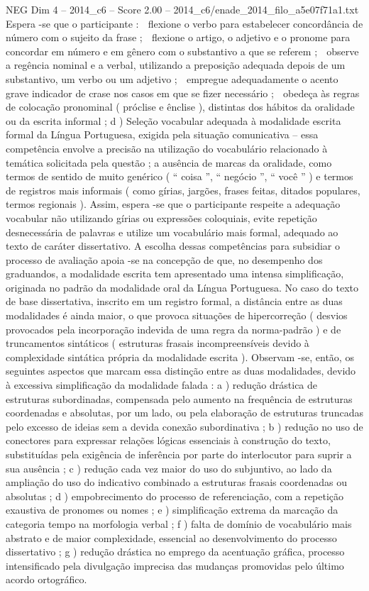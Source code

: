 \begin{textsample}{NEG Dim 4 – 2014\_c6 – Score 2.00 – 2014\_c6/enade\_2014\_filo\_a5e07f71a1.txt}
Espera -se que o participante :  flexione o verbo para estabelecer concordância de número com o sujeito da frase ;  flexione o artigo, o adjetivo e o pronome para concordar em número e em gênero com o substantivo a que se referem ;  observe a regência nominal e a verbal, utilizando a preposição adequada depois de um substantivo, um verbo ou um adjetivo ;  empregue adequadamente o acento grave indicador de crase nos casos em que se fizer necessário ;  obedeça às regras de colocação pronominal ( próclise e ênclise ), distintas dos hábitos da oralidade ou da escrita informal ; d ) Seleção vocabular adequada à modalidade escrita formal da Língua Portuguesa, exigida pela situação comunicativa – essa competência envolve a precisão na utilização do vocabulário relacionado à temática solicitada pela questão ; a ausência de marcas da oralidade, como termos de sentido de muito genérico ( “ coisa ”, “ negócio ”, “ você ” ) e termos de registros mais informais ( como gírias, jargões, frases feitas, ditados populares, termos regionais ).
Assim, espera -se que o participante respeite a adequação vocabular não utilizando gírias ou expressões coloquiais, evite repetição desnecessária de palavras e utilize um vocabulário mais formal, adequado ao texto de caráter dissertativo.
A escolha dessas competências para subsidiar o processo de avaliação apoia -se na concepção de que, no desempenho dos graduandos, a modalidade escrita tem apresentado uma intensa simplificação, originada no padrão da modalidade oral da Língua Portuguesa.
No caso do texto de base dissertativa, inscrito em um registro formal, a distância entre as duas modalidades é ainda maior, o que provoca situações de hipercorreção ( desvios provocados pela incorporação indevida de uma regra da norma-padrão ) e de truncamentos sintáticos ( estruturas frasais incompreensíveis devido à complexidade sintática própria da modalidade escrita ).
Observam -se, então, os seguintes aspectos que marcam essa distinção entre as duas modalidades, devido à excessiva simplificação da modalidade falada : a ) redução drástica de estruturas subordinadas, compensada pelo aumento na frequência de estruturas coordenadas e absolutas, por um lado, ou pela elaboração de estruturas truncadas pelo excesso de ideias sem a devida conexão subordinativa ; b ) redução no uso de conectores para expressar relações lógicas essenciais à construção do texto, substituídas pela exigência de inferência por parte do interlocutor para suprir a sua ausência ; c ) redução cada vez maior do uso do subjuntivo, ao lado da ampliação do uso do indicativo combinado a estruturas frasais coordenadas ou absolutas ; d ) empobrecimento do processo de referenciação, com a repetição exaustiva de pronomes ou nomes ; e ) simplificação extrema da marcação da categoria tempo na morfologia verbal ; f ) falta de domínio de vocabulário mais abstrato e de maior complexidade, essencial ao desenvolvimento do processo dissertativo ; g ) redução drástica no emprego da acentuação gráfica, processo intensificado pela divulgação imprecisa das mudanças promovidas pelo último acordo ortográfico.

\end{textsample}
